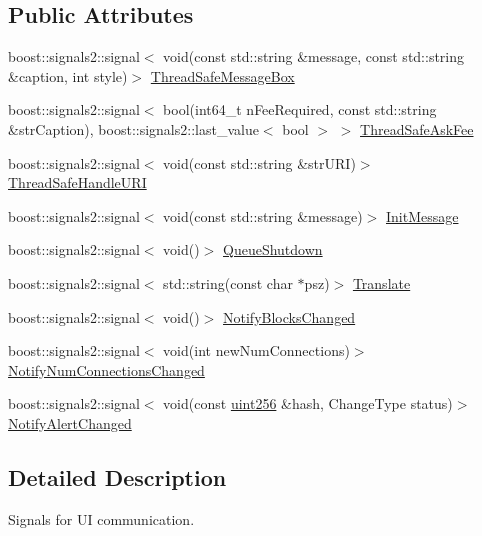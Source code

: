 \subsection*{Public Attributes}
\begin{DoxyCompactItemize}
\item 
boost\+::signals2\+::signal$<$ void(const std\+::string \&message, const std\+::string \&caption, int style)$>$ \mbox{\hyperlink{class_c_client_u_i_interface_a5bc5d70a8113304ede47126cb6109e8a}{Thread\+Safe\+Message\+Box}}
\item 
boost\+::signals2\+::signal$<$ bool(int64\+\_\+t n\+Fee\+Required, const std\+::string \&str\+Caption), boost\+::signals2\+::last\+\_\+value$<$ bool $>$ $>$ \mbox{\hyperlink{class_c_client_u_i_interface_aa234f11720b22eab8693a9f894938702}{Thread\+Safe\+Ask\+Fee}}
\item 
boost\+::signals2\+::signal$<$ void(const std\+::string \&str\+U\+RI)$>$ \mbox{\hyperlink{class_c_client_u_i_interface_a307f12eb3aadb694a82eb16714441d75}{Thread\+Safe\+Handle\+U\+RI}}
\item 
boost\+::signals2\+::signal$<$ void(const std\+::string \&message)$>$ \mbox{\hyperlink{class_c_client_u_i_interface_abc63cc3f3e5e15632f713d859dbc6bc2}{Init\+Message}}
\item 
boost\+::signals2\+::signal$<$ void()$>$ \mbox{\hyperlink{class_c_client_u_i_interface_aaf177167fd4e961bb2c9997b71d53158}{Queue\+Shutdown}}
\item 
boost\+::signals2\+::signal$<$ std\+::string(const char $\ast$psz)$>$ \mbox{\hyperlink{class_c_client_u_i_interface_a996160f65965769cf7fc50e6fd17dc9a}{Translate}}
\item 
boost\+::signals2\+::signal$<$ void()$>$ \mbox{\hyperlink{class_c_client_u_i_interface_a9abb0fe3e1714ef9ed37f93da2d98e4b}{Notify\+Blocks\+Changed}}
\item 
boost\+::signals2\+::signal$<$ void(int new\+Num\+Connections)$>$ \mbox{\hyperlink{class_c_client_u_i_interface_a496995d44db8dc3e3ef84d345e25967d}{Notify\+Num\+Connections\+Changed}}
\item 
boost\+::signals2\+::signal$<$ void(const \mbox{\hyperlink{classuint256}{uint256}} \&hash, Change\+Type status)$>$ \mbox{\hyperlink{class_c_client_u_i_interface_a2c42ebdda06512513445cd86881b157a}{Notify\+Alert\+Changed}}
\end{DoxyCompactItemize}


\subsection{Detailed Description}
Signals for UI communication. 

